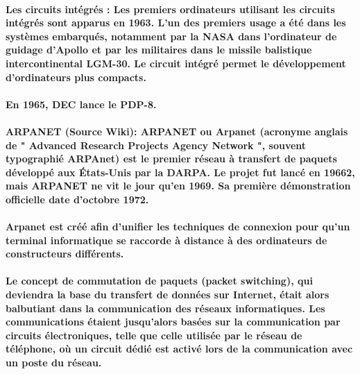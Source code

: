 \paragraph{
  Les circuits intégrés : Les premiers ordinateurs utilisant les circuits intégrés sont apparus en 1963. L'un des premiers usage a été dans les systèmes embarqués, notamment par la NASA dans l'ordinateur de guidage d'Apollo et par les militaires dans le missile balistique intercontinental LGM-30. Le circuit intégré permet le développement d'ordinateurs plus compacts.
}

\paragraph{
  En 1965, DEC lance le PDP-8.
}


\paragraph{
  ARPANET (Source Wiki): ARPANET ou Arpanet (acronyme anglais de " Advanced Research Projects Agency Network ", souvent typographié ARPAnet) est le premier réseau à transfert de paquets développé aux États-Unis par la DARPA. Le projet fut lancé en 19662, mais ARPANET ne vit le jour qu'en 1969. Sa première démonstration officielle date d'octobre 1972.
}

\paragraph{
  Arpanet est créé afin d'unifier les techniques de connexion pour qu'un terminal informatique se raccorde à distance à des ordinateurs de constructeurs différents.
}

\paragraph{
  Le concept de commutation de paquets (packet switching), qui deviendra la base du transfert de données sur Internet, était alors balbutiant dans la communication des réseaux informatiques. Les communications étaient jusqu'alors basées sur la communication par circuits électroniques, telle que celle utilisée par le réseau de téléphone, où un circuit dédié est activé lors de la communication avec un poste du réseau.
}

